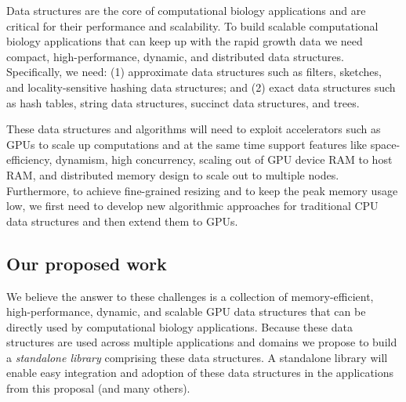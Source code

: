 Data structures are the core of computational biology applications and are critical for their performance and scalability.
To build scalable computational biology applications that can keep up with the rapid growth data we need compact, high-performance, dynamic, and distributed data structures. Specifically, we need: (1) approximate data structures such as filters, sketches, and locality-sensitive hashing data structures; and (2) exact data structures such as hash tables, string data structures, succinct data structures, and trees.

These data structures and algorithms will need to exploit accelerators such as GPUs to scale up computations and at the same time support  features like space-efficiency, dynamism, high concurrency, scaling out of GPU device RAM to host RAM, and distributed memory design to scale out to multiple nodes.
%
Furthermore, to achieve fine-grained resizing and to keep the peak memory usage low, we first need to develop new algorithmic approaches for traditional CPU data structures and then extend them to GPUs.

\subsection{Our proposed work}

We believe the answer to these challenges is a collection of  memory-efficient, high-performance, dynamic, and scalable GPU data structures that can be directly used by computational biology applications. Because these data structures are used across multiple applications and domains we propose to build a \emph{standalone library} comprising these data structures. A standalone library will enable easy integration and adoption of these data structures in the applications from this proposal (and many others).

